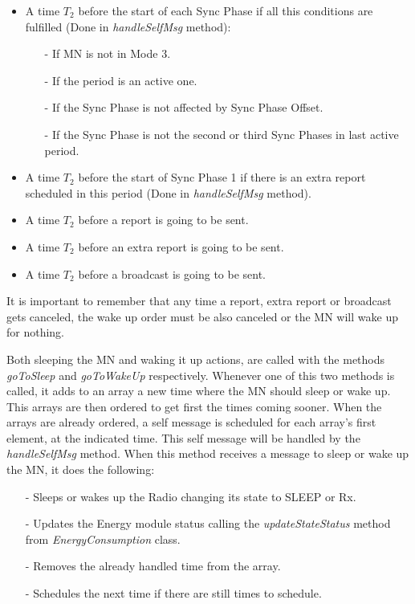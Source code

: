 \begin{itemize}
  \item A time $T_2$ before the start of each Sync Phase if all this conditions are fulfilled (Done in \textit{handleSelfMsg} method):
    \begin{itemize}
      \item[-] If \ac{MN} is not in Mode 3.
      \item[-] If the period is an active one.
      \item[-] If the Sync Phase is not affected by Sync Phase Offset.
      \item[-] If the Sync Phase is not the second or third Sync Phases in last active period.
    \end{itemize}
  
  \item A time $T_2$ before the start of Sync Phase 1 if there is an extra report scheduled in this period (Done in \textit{handleSelfMsg} method).
  
  \item A time $T_2$ before a report is going to be sent.

  \item A time $T_2$ before an extra report is going to be sent.

  \item A time $T_2$ before a broadcast is going to be sent.
\end{itemize}

It is important to remember that any time a report, extra report or broadcast gets canceled, the wake up order must be also canceled or the \ac{MN}
will wake up for nothing.

Both sleeping the \ac{MN} and waking it up actions, are called with the methods \textit{goToSleep} and \textit{goToWakeUp} respectively. Whenever
one of this two methods is called, it adds to an array a new time where the \ac{MN} should sleep or wake up. This arrays are then ordered to get
first the times coming sooner. When the arrays are already ordered, a self message is scheduled for each array's first element, at the indicated 
time. This self message will be handled by the \textit{handleSelfMsg} method. When this method receives a message to sleep or wake up the \ac{MN},
it does the following:
\begin{itemize}
 \item[-] Sleeps or wakes up the Radio changing its state to SLEEP or \ac{Rx}.
 
 \item[-] Updates the Energy module status calling the \textit{updateStateStatus} method from \textit{EnergyConsumption} class.

 \item[-] Removes the already handled time from the array.

 \item[-] Schedules the next time if there are still times to schedule.
\end{itemize}




